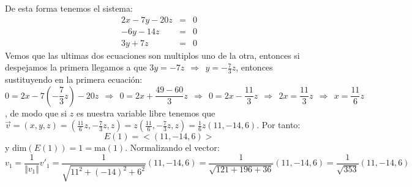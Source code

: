 \begin{itemize}
\begin{itemize}
        De esta forma tenemos el sistema:
        \begin{eqnarray*}
        2x-7y-20z&=&0\\
        -6y-14z&=&0\\
        3y+7z&=&0
        \end{eqnarray*}
        Vemos que las ultimas dos ecuaciones son multiplos uno de la otra, entonces si despejamos la primera llegamos a que $\displaystyle 3y=-7z~~\Longrightarrow~~y=-\frac{7}{3}z$, entonces
        sustituyendo en la primera ecuaci\'on:
        \[0=2x-7\left(-\frac{7}{3}z\right)-20z~~\Longrightarrow~~0=2x+\frac{49-60}{3}z~~\Longrightarrow~~0=2x-\frac{11}{3}z~~\Longrightarrow~~2x=\frac{11}{3}z~~\Longrightarrow~~x=\frac{11}{6}z\], de modo que si $z$ es nuestra variable libre tenemos que $\displaystyle \vec{v}=(x,y,z)=\left(\frac{11}{6}z,-\frac{7}{3}z,z\right)=z\left(\frac{11}{6},-\frac{7}{3}z,z\right)=\frac{1}{6}z(11,-14,6)$. Por tanto:
        \[E(1)=<(11,-14,6)>\]
        y $\text{dim}(E(1))=1=\text{ma}(1)$. 
        Normalizando el vector:
        \[v_1=\frac{1}{\Vert v_1\Vert}v'_1=\frac{1}{\sqrt{11^2+(-14)^2+6^2}}(11,-14,6)=\frac{1}{\sqrt{121+196+36}}(11,-14,6)=\frac{1}{\sqrt{353}}(11,-14,6)\]
        

\end{itemize}
\end{itemize}
